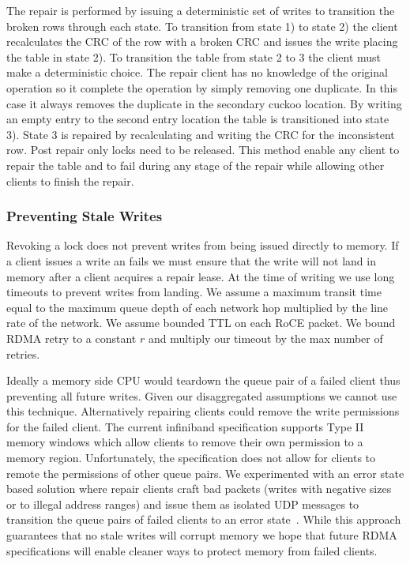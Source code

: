The repair is performed by issuing a deterministic set of
writes to transition the broken rows through each state. To
transition from state 1) to state 2) the client recalculates
the CRC of the row with a broken CRC and issues the write
placing the table in state 2). To transition the table from
state 2 to 3 the client must make a deterministic choice.
The repair client has no knowledge of the original operation
so it complete the operation by simply removing one
duplicate. In this case it always removes the duplicate in
the secondary cuckoo location. By writing an empty entry to
the second entry location the table is transitioned into
state 3). State 3 is repaired by recalculating and writing
the CRC for the inconsistent row. Post repair only locks
need to be released. This method enable any client to repair
the table and to fail during any stage of the repair while
allowing other clients to finish the repair.

\subsubsection{Preventing Stale Writes}
\label{sec:stale-writes}
Revoking a lock does not prevent writes from being issued
directly to memory. If a client issues a write an fails we
must ensure that the write will not land in memory after a
client acquires a repair lease. At the time of writing we
use long timeouts to prevent writes from landing. We assume
a maximum transit time equal to the maximum queue depth of
each network hop multiplied by the line rate of the network.
We assume bounded TTL on each RoCE packet. We bound RDMA
retry to a constant $r$ and multiply our timeout by the max
number of retries.

Ideally a memory side CPU would teardown the queue pair of a
failed client thus preventing all future writes. Given our
disaggregated assumptions we cannot use this technique.
Alternatively repairing clients could remove the write
permissions for the failed client. The current infiniband
specification supports Type II memory windows which allow
clients to remove their own permission to a memory region.
Unfortunately, the specification does not allow for clients
to remote the permissions of other queue pairs. We
experimented with an error state based solution where repair
clients craft bad packets (writes with negative sizes or to
illegal address ranges) and issue them as isolated UDP
messages to transition the queue pairs of failed clients to
an error state~\cite{redmark}. While this approach
guarantees that no stale writes will corrupt memory we hope
that future RDMA specifications will enable cleaner ways to
protect memory from failed clients.

